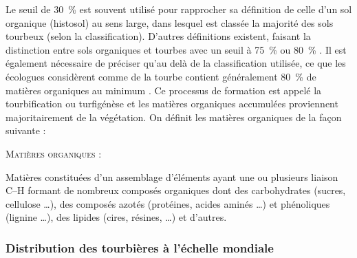 Le seuil de \SI{30}{\percent} est souvent utilisé pour rapprocher sa définition de celle d'un sol organique (histosol) au sens large, dans lesquel est classée la majorité des sols tourbeux (selon la classification).
D'autres définitions existent, faisant la distinction entre sols organiques et tourbes avec un seuil à \SI{75}{\percent} \citep{andrejko1983} ou \SI{80}{\percent} \citep{landva1983}.
Il est également nécessaire de préciser qu'au delà de la classification utilisée, ce que les écologues considèrent comme de la tourbe contient généralement \SI{80}{\percent} de matières organiques au minimum \citep{rydin2013b}.
Ce processus de formation est appelé la tourbification ou turfigénèse et les matières organiques accumulées proviennent majoritairement de la végétation.
On définit les matières organiques de la façon suivante : 
\begin{pdef}
\textsc{Matières organiques} :

Matières constituées d'un assemblage d'éléments ayant une ou plusieurs liaison C--H formant de nombreux composés organiques dont des carbohydrates (sucres, cellulose \dots), des composés azotés (protéines, acides aminés \dots) et phénoliques (lignine \dots), des lipides (cires, résines, \dots) et d'autres\footnotemark.

\end{pdef}


\subsubsection{Distribution des tourbières à l'échelle mondiale}

